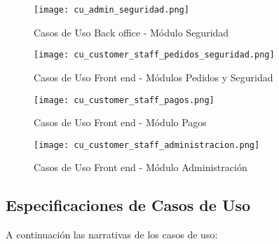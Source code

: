     \begin{figure}[H]
        \texttt{[image: cu\_admin\_seguridad.png]}
        \caption{Casos de Uso Back office - Módulo Seguridad}
        \label{fig:cu_admin_seguridad}
        \centering
    \end{figure}

    \begin{figure}[H]
        \texttt{[image: cu\_customer\_staff\_pedidos\_seguridad.png]}
        \caption{Casos de Uso Front end - Módulos Pedidos y Seguridad}
        \label{fig:cu_customer_staff_pedidos}
        \centering
    \end{figure}

    \begin{figure}[H]
        \texttt{[image: cu\_customer\_staff\_pagos.png]}
        \caption{Casos de Uso Front end - Módulo Pagos}
        \label{fig:cu_customer_staff_pagos}
        \centering
    \end{figure}

    \begin{figure}[H]
        \texttt{[image: cu\_customer\_staff\_administracion.png]}
        \caption{Casos de Uso Front end - Módulo Administración}
        \label{fig:cu_customer_staff_administracion}
        \centering
    \end{figure}

    \subsection{Especificaciones de Casos de Uso}
    A continuación las narrativas de los casos de uso:

